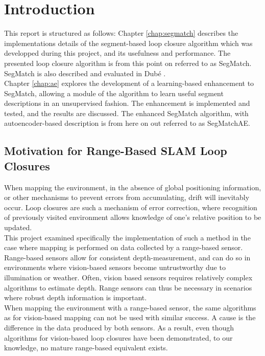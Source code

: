 \chapter{Introduction}
\label{sec:introduction}

This report is structured as follows: Chapter \ref{chap:segmatch} describes the implementations details of the segment-based loop closure algorithm which was developped during this project, and its usefulness and performance. The presented loop closure algorithm is from this point on referred to as SegMatch. SegMatch is also described and evaluated in Dubé \cite{segmatch}.\\

Chapter \ref{chap:ae} explores the development of a learning-based enhancement to SegMatch, allowing a module of the algorithm to learn useful segment descriptions in an unsupervised fashion. The enhancement is implemented and tested, and the results are discussed. The enhanced SegMatch algorithm, with autoencoder-based description is from here on out referred to as SegMatchAE.\\

\section{Motivation for Range-Based SLAM Loop Closures}
\label{sec:motivation}

When mapping the environment, in the absence of global positioning information, or other mechanisms to prevent errors from accumulating, drift will inevitably occur. Loop closures are such a mechanism of error correction, where recognition of previously visited environment allows knowledge of one's relative position to be updated.\\ 

This project examined specifically the implementation of such a method in the case where mapping is performed on data collected by a range-based sensor.\\

Range-based sensors allow for consistent depth-measurement, and can do so in environments where vision-based sensors become untrustworthy due to illumination or weather. Often, vision based sensors requires relatively complex algorithms to estimate depth. Range sensors can thus be necessary in scenarios where robust depth information is important.\\

When mapping the environment with a range-based sensor, the same algorithms as for vision-based mapping can not be used with similar success. A cause is the difference in the data produced by both sensors. As a result, even though algorithms for vision-based loop closures have been demonstrated, to our knowledge, no mature range-based equivalent exists.\\

